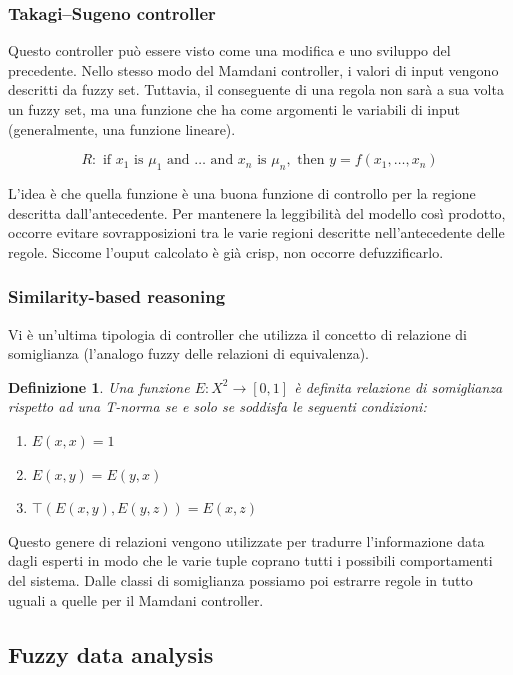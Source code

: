 \documentclass[10pt,a4paper]{article}
\newtheorem{definition}{Definizione}
\begin{document}
\subsubsection{Takagi–Sugeno controller}

Questo controller può essere visto come una modifica e uno sviluppo del precedente. Nello stesso modo del Mamdani controller, i valori di input vengono descritti da fuzzy set. Tuttavia, il conseguente di una regola non sarà a sua volta un fuzzy set, ma una funzione che ha come argomenti le variabili di input (generalmente, una funzione lineare).

$$
R : \text{ if } x_1 \text{ is } \mu_1 \text{ and } \dots \text{ and } x_n \text{ is } \mu_n, \text{ then } y = f(x_1,\dots,x_n)
$$

 L'idea è che quella funzione è una buona funzione di controllo per la regione descritta dall'antecedente. Per mantenere la leggibilità del modello così prodotto, occorre evitare sovrapposizioni tra le varie regioni descritte nell'antecedente delle regole. Siccome l'ouput calcolato è già crisp, non occorre defuzzificarlo.
 
\subsubsection{Similarity-based reasoning}

Vi è un'ultima tipologia di controller che utilizza il concetto di relazione di somiglianza (l'analogo fuzzy delle relazioni di equivalenza).

\begin{definition}
Una funzione $E: X^2 \to [0,1]$ è definita \emph{relazione di somiglianza} rispetto ad una T-norma se e solo se soddisfa le seguenti condizioni:
\begin{enumerate}
\item{$E(x,x) = 1$}
\item{$E(x,y) = E(y,x)$}
\item{$\top (E(x,y),E(y,z)) = E(x,z)$}
\end{enumerate} 
\end{definition}

Questo genere di relazioni vengono utilizzate per tradurre l'informazione data dagli esperti in modo che le varie tuple coprano tutti i possibili comportamenti del sistema. Dalle classi di somiglianza possiamo poi estrarre regole in tutto uguali a quelle per il Mamdani controller.

\subsection{Fuzzy data analysis}
\end{document}
